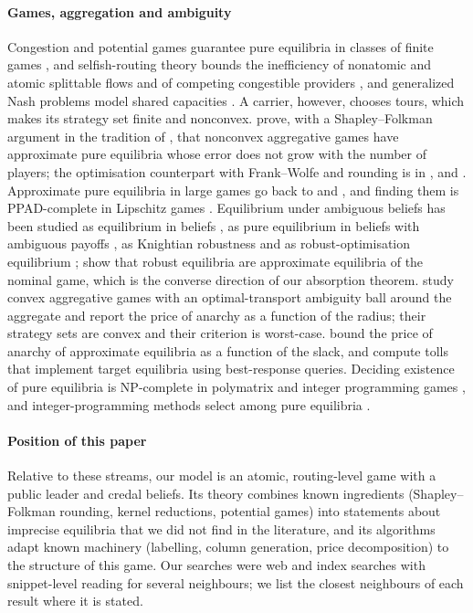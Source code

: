 \documentclass[preprint,12pt]{elsarticle}
\theoremstyle{definition}
\theoremstyle{remark}
\begin{document}
\paragraph{Games, aggregation and ambiguity} Congestion and potential games guarantee pure equilibria in classes of finite games \citep{Rosenthal1973,Monderer1996}, and selfish-routing theory bounds the inefficiency of nonatomic and atomic splittable flows and of competing congestible providers \citep{Wardrop1952,Orda1993,Roughgarden2002,Acemoglu2007,Cominetti2009}, and generalized Nash problems model shared capacities \citep{Facchinei2010}. A carrier, however, chooses tours, which makes its strategy set finite and nonconvex. \citet{Liu2023} prove, with a Shapley--Folkman argument in the tradition of \citet{Starr1969}, that nonconvex aggregative games have approximate pure equilibria whose error does not grow with the number of players; the optimisation counterpart with Frank--Wolfe and rounding is in \citet{Aubin1976}, \citet{Udell2016} and \citet{Bonnans2023}. Approximate pure equilibria in large games go back to \citet{Kalai2004} and \citet{Azrieli2013}, and finding them is PPAD-complete in Lipschitz games \citep{Goldberg2023}. Equilibrium under ambiguous beliefs has been studied as equilibrium in beliefs \citep{Lo1996,Marinacci2000}, as pure equilibrium in beliefs with ambiguous payoffs \citep{Beauchene2016}, as Knightian robustness \citep{Stauber2011} and as robust-optimisation equilibrium \citep{Aghassi2006,Crespi2025}; \citet{Crespi2025} show that robust equilibria are approximate equilibria of the nominal game, which is the converse direction of our absorption theorem. \citet{Feik2026} study convex aggregative games with an optimal-transport ambiguity ball around the aggregate and report the price of anarchy as a function of the radius; their strategy sets are convex and their criterion is worst-case. \citet{Christodoulou2011} bound the price of anarchy of approximate equilibria as a function of the slack, and \citet{Bhaskar2019} compute tolls that implement target equilibria using best-response queries. Deciding existence of pure equilibria is NP-complete in polymatrix and integer programming games \citep{Apt2022,Carvalho2022}, and integer-programming methods select among pure equilibria \citep{Dragotto2023}.

\paragraph{Position of this paper} Relative to these streams, our model is an atomic, routing-level game with a public leader and credal beliefs. Its theory combines known ingredients (Shapley--Folkman rounding, kernel reductions, potential games) into statements about imprecise equilibria that we did not find in the literature, and its algorithms adapt known machinery (labelling, column generation, price decomposition) to the structure of this game. Our searches were web and index searches with snippet-level reading for several neighbours; we list the closest neighbours of each result where it is stated.
\end{document}

